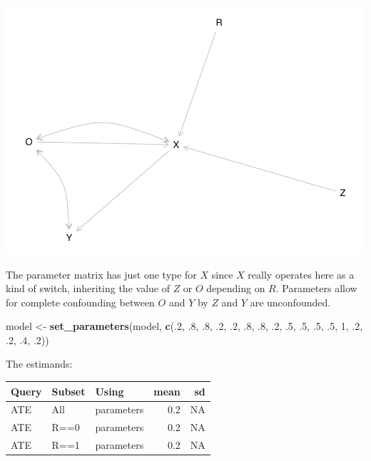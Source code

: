 \documentclass[12pt,]{book}
\newenvironment{Shaded}{\begin{snugshade}}{\end{snugshade}}
\newcommand{\DecValTok}[1]{\textcolor[rgb]{0.00,0.00,0.81}{#1}}
\newcommand{\FloatTok}[1]{\textcolor[rgb]{0.00,0.00,0.81}{#1}}
\newcommand{\KeywordTok}[1]{\textcolor[rgb]{0.13,0.29,0.53}{\textbf{#1}}}
\newcommand{\NormalTok}[1]{#1}
\newcommand{\StringTok}[1]{\textcolor[rgb]{0.31,0.60,0.02}{#1}}
\begin{document}
\includegraphics{ii_files/figure-latex/unnamed-chunk-138-1.pdf}

The parameter matrix has just one type for \(X\) since \(X\) really operates here as a kind of switch, inheriting the value of \(Z\) or \(O\) depending on \(R\). Parameters allow for complete confounding between \(O\) and \(Y\) by \(Z\) and \(Y\) are unconfounded.

\begin{Shaded}
\begin{Highlighting}[]
\NormalTok{model <-}\StringTok{ }\KeywordTok{set_parameters}\NormalTok{(model, }\KeywordTok{c}\NormalTok{(.}\DecValTok{2}\NormalTok{, }\FloatTok{.8}\NormalTok{, }
                                 \FloatTok{.8}\NormalTok{, }\FloatTok{.2}\NormalTok{, }
                                 \FloatTok{.2}\NormalTok{, }\FloatTok{.8}\NormalTok{, }
                                 \FloatTok{.8}\NormalTok{, }\FloatTok{.2}\NormalTok{, }
                                 \FloatTok{.5}\NormalTok{, }\FloatTok{.5}\NormalTok{, }
                                 \FloatTok{.5}\NormalTok{, }\FloatTok{.5}\NormalTok{, }
                                 \DecValTok{1}\NormalTok{,}
                                 \FloatTok{.2}\NormalTok{, }\FloatTok{.2}\NormalTok{, }\FloatTok{.4}\NormalTok{, }\FloatTok{.2}\NormalTok{))}
\end{Highlighting}
\end{Shaded}

The estimands:

\begin{tabular}{l|l|l|r|r}
\hline
Query & Subset & Using & mean & sd\\
\hline
ATE & All & parameters & 0.2 & NA\\
\hline
ATE & R==0 & parameters & 0.2 & NA\\
\hline
ATE & R==1 & parameters & 0.2 & NA\\
\hline
\end{tabular}
\end{document}
